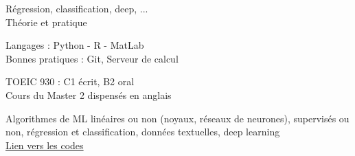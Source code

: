 

Régression, classification, deep, ... \\
Théorie et pratique\\
\vspace{0.3cm}

Langages :  Python - R - MatLab \\
Bonnes pratiques : Git, Serveur de calcul
\vspace{0.3cm}


TOEIC 930 : C1 écrit, B2 oral\\
Cours du Master 2 dispensés en anglais
\vspace{0.25cm}






Algorithmes de ML linéaires ou non (noyaux, réseaux de neurones), supervisés ou non, régression et classification, données textuelles, deep learning\\
{\color{heading} \href{https://github.com/ClaireGayral/formation_openclassroom}{Lien vers les codes} 
}

